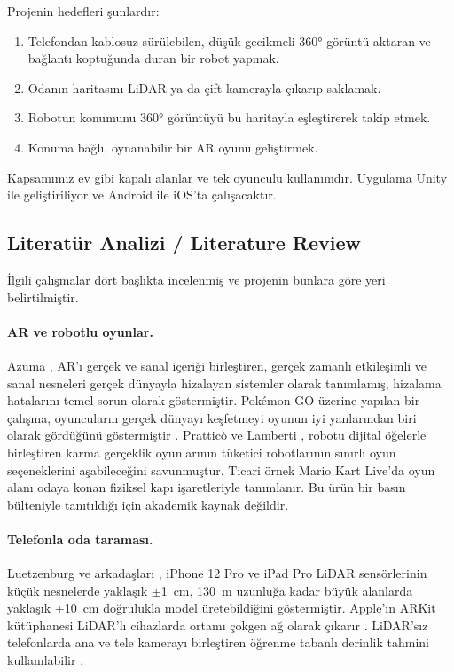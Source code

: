 \documentclass[11pt,a4paper]{article}
\begin{document}
Projenin hedefleri şunlardır:
\begin{enumerate}[label=H\arabic*.]
  \item Telefondan kablosuz sürülebilen, düşük gecikmeli 360° görüntü aktaran ve bağlantı koptuğunda duran bir robot yapmak.
  \item Odanın haritasını LiDAR ya da çift kamerayla çıkarıp saklamak.
  \item Robotun konumunu 360° görüntüyü bu haritayla eşleştirerek takip etmek.
  \item Konuma bağlı, oynanabilir bir AR oyunu geliştirmek.
\end{enumerate}
Kapsamımız ev gibi kapalı alanlar ve tek oyunculu kullanımdır. Uygulama Unity ile geliştiriliyor ve Android ile iOS'ta çalışacaktır.

\subsection{Literatür Analizi / Literature Review}
\label{subsec:literatur}
İlgili çalışmalar dört başlıkta incelenmiş ve projenin bunlara göre yeri belirtilmiştir.

\paragraph{AR ve robotlu oyunlar.}
Azuma \cite{azuma1997survey}, AR'ı gerçek ve sanal içeriği birleştiren, gerçek zamanlı etkileşimli ve sanal nesneleri gerçek dünyayla hizalayan sistemler olarak tanımlamış, hizalama hatalarını temel sorun olarak göstermiştir. Pokémon GO üzerine yapılan bir çalışma, oyuncuların gerçek dünyayı keşfetmeyi oyunun iyi yanlarından biri olarak gördüğünü göstermiştir \cite{paavilainen2017pokemon}. Pratticò ve Lamberti \cite{prattico2021mixed}, robotu dijital öğelerle birleştiren karma gerçeklik oyunlarının tüketici robotlarının sınırlı oyun seçeneklerini aşabileceğini savunmuştur. Ticari örnek Mario Kart Live'da \cite{mariokartlive2020} oyun alanı odaya konan fiziksel kapı işaretleriyle tanımlanır. Bu ürün bir basın bülteniyle tanıtıldığı için akademik kaynak değildir.

\paragraph{Telefonla oda taraması.}
Luetzenburg ve arkadaşları \cite{luetzenburg2021iphone}, iPhone 12 Pro ve iPad Pro LiDAR sensörlerinin küçük nesnelerde yaklaşık $\pm$1~cm, 130~m uzunluğa kadar büyük alanlarda yaklaşık $\pm$10~cm doğrulukla model üretebildiğini göstermiştir. Apple'ın ARKit kütüphanesi LiDAR'lı cihazlarda ortamı çokgen ağ olarak çıkarır \cite{apple2026arkit}. LiDAR'sız telefonlarda ana ve tele kamerayı birleştiren öğrenme tabanlı derinlik tahmini kullanılabilir \cite{zhang2020dunet}.
\end{document}
